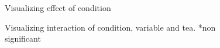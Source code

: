 \documentclass{article}
\begin{document}
\begin{figure}[H]
  \caption{Visualizing effect of condition}
  \noindent{}
  \centering
\end{figure}

\begin{figure}[H]
  \caption{Visualizing interaction of condition, variable and tea. *non significant}
  \noindent{}
  \centering
\end{figure}
\end{document}
